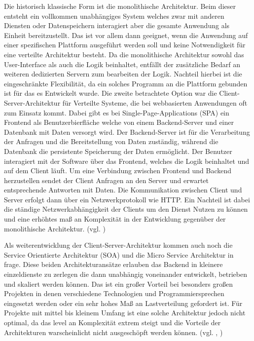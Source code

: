 Die historisch klassische Form ist die monolithische Architektur. Beim dieser entsteht ein vollkommen unabhängiges System welches zwar mit anderen Diensten oder Datenspeichern interagiert aber die gesamte Anwendung als Einheit bereitzustellt. Das ist vor allem dann geeignet, wenn die Anwendung auf einer spezifischen Plattform ausgeführt werden soll und keine Notwendigkeit für eine verteilte Architektur besteht. Da die monolithische Architektur sowohl das User-Interface als auch die Logik beinhaltet, entfällt der zusätzliche Bedarf an weiteren dedizierten Servern zum bearbeiten der Logik. Nachteil hierbei ist die eingeschränkte Flexibilität, da ein solches Programm an die Plattform gebunden ist für das es Entwickelt wurde.
Die zweite betrachtete Option war die Client-Server-Architektur für Verteilte Systeme, die bei webbasierten Anwendungen oft zum Einsatz kommt. Dabei gibt es \zB bei Single-Page-Applications (SPA) ein Frontend als Benutzerbierfläche welche von einem Backend-Server und einer Datenbank mit Daten versorgt wird. Der Backend-Server ist für die Verarbeitung der Anfragen und die Bereitstellung von Daten zuständig, während die Datenbank die persistente Speicherung der Daten ermöglicht. Der Benutzer interagiert mit der Software über das Frontend, welches die Logik beinhaltet und auf dem Client läuft. Um eine Verbindung zwischen Frontend und Backend herzustellen sendet der Client Anfragen an den Server und erwartet entsprechende Antworten mit Daten. Die Kommunikation zwischen Client und Server erfolgt dann über ein Netzwerkprotokoll wie HTTP. Ein Nachteil ist dabei die ständige Netzwerkabhängigkeit der Clients um den Dienst Nutzen zu können und eine erhöhtes maß an Komplexität in der Entwicklung gegenüber der monolithische Architektur. (vgl. \cite{SPA})

Als weiterentwicklung der Client-Server-Architektur kommen auch noch die Service Orientierte Architektur (SOA) und die Micro Service Architektur in frage. Diese beiden Architekturansätze erlauben das Backend in kleinere einzeldienste zu zerlegen die dann unabhängig voneinander entwickelt, betrieben und skaliert werden können. Das ist ein großer Vorteil bei besonders großen Projekten in denen verschiedene Technologien und Programmiersprechen eingesetzt werden oder ein sehr hohes Maß an Lastverteilung gefordert ist. Für Projekte mit mittel bis kleinem Umfang ist eine solche Architektur jedoch nicht optimal, da das level an Komplexität extrem steigt und die Vorteile der Architekturen warscheinlicht nicht ausgeschöpft werden können. (vgl. \cite{SOA}, \cite{Micro})

